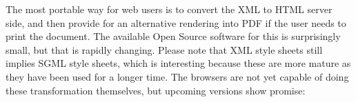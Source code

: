 


      
      

The most portable way for web users is to convert the XML to HTML
server side, and then provide for an alternative rendering into PDF if
the user needs to print the document.  The available Open Source
software for this is surprisingly small, but that is rapidly changing.
Please note that XML style sheets still implies SGML style sheets,
which is interesting because these are more mature as they have been
used for a longer time.  The browsers are not yet capable of doing
these transformation themselves, but upcoming versions show promise:


